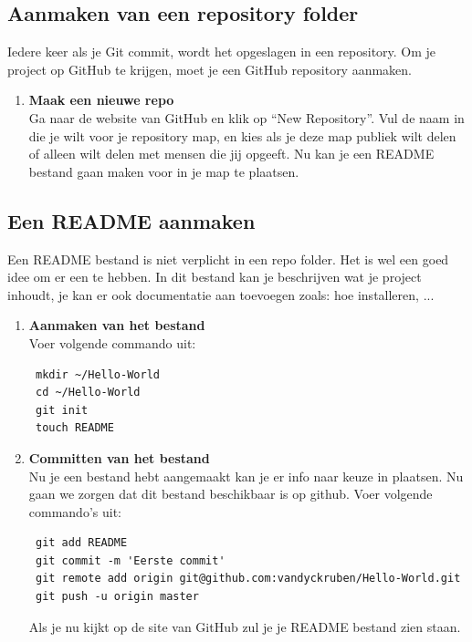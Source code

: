 \documentclass[12pt]{article} %
\begin{document}
\subsection{Aanmaken van een repository folder} \label{sec:Aanmaken van een repository folder}

Iedere keer als je Git commit, wordt het opgeslagen in een repository. Om je project op GitHub te krijgen, moet je een GitHub repository aanmaken.

\begin{enumerate}
 \item \textbf{Maak een nieuwe repo} \\
Ga naar de website van GitHub en klik op ``New Repository''.
Vul de naam in die je wilt voor je repository map, en kies als je deze map publiek wilt delen of alleen wilt delen met mensen die jij opgeeft.
Nu kan je een README bestand gaan maken voor in je map te plaatsen.

\end{enumerate}
\newpage
\subsection{Een README aanmaken} \label{sec:Een README aanmaken}

Een README bestand is niet verplicht in een repo folder. Het is wel een goed idee om er een te hebben.
In dit bestand kan je beschrijven wat je project inhoudt, je kan er ook documentatie aan toevoegen zoals: hoe installeren, ...

\begin{enumerate}
 \item \textbf{Aanmaken van het bestand}\\
Voer volgende commando uit:

\begin{lstlisting}
 mkdir ~/Hello-World
 cd ~/Hello-World
 git init
 touch README
\end{lstlisting}

\item \textbf{Committen van het bestand}\\
Nu je een bestand hebt aangemaakt kan je er info naar keuze in plaatsen. Nu gaan we zorgen dat dit bestand beschikbaar is op github.
Voer volgende commando's uit:

\begin{lstlisting}
 git add README
 git commit -m 'Eerste commit'
 git remote add origin git@github.com:vandyckruben/Hello-World.git
 git push -u origin master
\end{lstlisting}
Als je nu kijkt op de site van GitHub zul je je README bestand zien staan.

\end{enumerate}
\newpage
\end{document}
